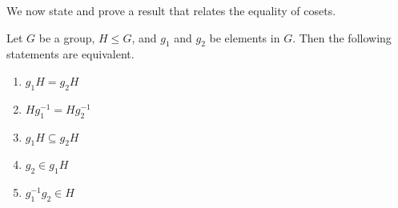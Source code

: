 We now state and prove a result that relates the equality of cosets.
\begin{lemma}\label{lemma-coset-equality}
    Let $G$ be a group, $H \leq G$, and $g_1$ and $g_2$ be elements in $G$. Then the following statements are equivalent.
    \begin{enumerate}[label=$(\arabic*)$]
        \item $g_1H = g_2H$
        \item $Hg_1^{-1} = Hg_2^{-1}$
        \item $g_1H \subseteq g_2H$
        \item $g_2 \in g_1H$
        \item $g_1^{-1}g_2 \in H$
    \end{enumerate}
\end{lemma}
